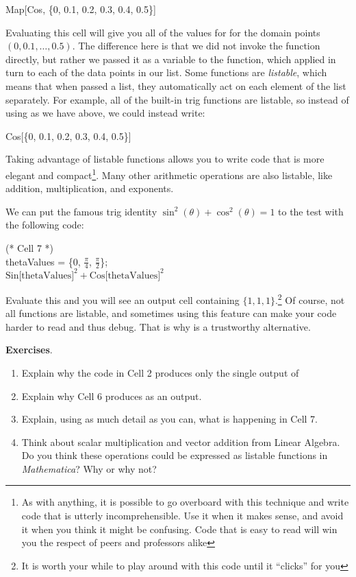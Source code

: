 \begin{code}
	   Map[Cos, \{0, 0.1, 0.2, 0.3, 0.4, 0.5\}]
\end{code}

Evaluating this cell will give you all of the values for  for the domain points $(0, 0.1, \dots, 0.5)$. The difference here is that we did not invoke the  function directly, but rather we passed it as a variable to the  function, which applied  in turn to each of the data points in our list. 
Some functions are \emph{listable}, which means that when passed a list, they automatically act on each element of the list separately. For example, all of the built-in trig functions are listable, so instead of using  as we have above, we could instead write:

\begin{code}
	   Cos[\{0, 0.1, 0.2, 0.3, 0.4, 0.5\}]
\end{code}

Taking advantage of listable functions allows you to write code that is more elegant and compact\footnote{As with anything, it is possible to go overboard with this technique and write code that is utterly incomprehensible. Use it when it makes sense, and avoid it when you think it might be confusing. Code that is easy to read will win you the respect of peers and professors alike}. Many other arithmetic operations are also listable, like addition, multiplication, and exponents. 

We can put the famous trig identity $\sin^2(\theta) + \cos^2(\theta) = 1$ to the test with the following code:

\begin{code}
	   (* Cell 7 *)\\
	   thetaValues = \{0, $\frac{\pi}{4}$, $\frac{\pi}{2}$\};\\
	   $\text{Sin[thetaValues]}^2 + \text{Cos[thetaValues]}^2$
\end{code}

Evaluate this and you will see an output cell containing $\{1,1,1\}$.\footnote{It is worth your while to play around with this code until it ``clicks'' for you} Of course, not all functions are listable, and sometimes using this feature can make your code harder to read and thus debug. That is why  is a trustworthy alternative. 

{\bf Exercises}. 
\begin{enumerate}
	   \item Explain why the code in Cell 2 produces only the single output of 
	   \item Explain why Cell 6 produces  as an output.
	   \item Explain, using as much detail as you can, what is happening in Cell 7.
	   \item Think about scalar multiplication and vector addition from Linear Algebra. Do you think these operations could be expressed as listable functions in \emph{Mathematica}? Why or why not?
\end{enumerate}
